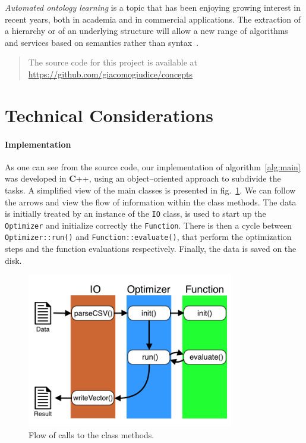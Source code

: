 \documentclass[a4paper,12pt,twoside]{article}
\def \bf {\textbf}
\begin{document}
{\em Automated ontology learning} is a topic that has been enjoying growing interest in recent years, both in academia and in commercial applications. 
The extraction of a hierarchy or of an underlying structure will allow a new range of algorithms and services based on semantics rather than syntax~\cite{bonino2004}. 

\begin{quote}
{The source code for this project is available at \\
 \url{https://github.com/giacomogiudice/concepts}}
\end{quote}




\newpage
\appendix
\section{Technical Considerations}
\label{section:tech}
\paragraph{Implementation} As one can see from the source code, our implementation of algorithm~\ref{alg:main} was developed in {\bf C++}, using an object--oriented approach to subdivide the tasks.
A simplified view of the main classes is presented in  fig.~\ref{fig:flow}.
We can follow the arrows and view the flow of information within the class methods.
The data is initially treated by an instance of the {\tt IO} class, is used to start up the {\tt Optimizer} and initialize correctly the {\tt Function}.
There is then a cycle between {\tt Optimizer::run()} and {\tt Function::evaluate()}, that perform the  optimization steps and the function evaluations respectively.
Finally, the data is saved on the disk.
\begin{figure}[h]
  \centerline{\includegraphics[width=9cm]{../img/classes.png}}
  \caption{Flow of calls to the class methods.}
  \label{fig:flow}
\end{figure}
\end{document}
